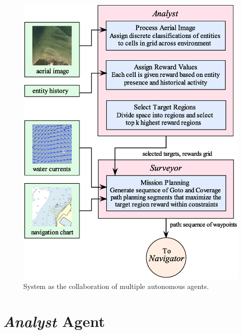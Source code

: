 \documentclass{tamuccthesis}
\begin{document}
\begin{figure}[H]
\includegraphics[width=\textwidth]{system_overview.eps}
\caption[System as the collaboration of multiple autonomous agents.]{System as the collaboration of multiple autonomous agents.}
\label{fig:system_overview}
\end{figure}

\section{\textit{Analyst} Agent}
\end{document}
